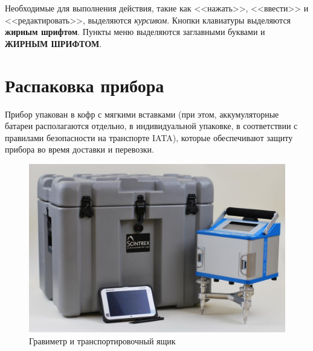 Необходимые для выполнения действия, такие как <<нажать>>, <<ввести>> и
<<редактировать>>, выделяются \textit{курсивом}. Кнопки клавиатуры выделяются
\textbf{жирным шрифтом}. Пункты меню выделяются заглавными буквами и
\textbf{ЖИРНЫМ ШРИФТОМ}.

\section{Распаковка прибора}

Прибор \cg{} упакован в кофр с мягкими вставками (при
этом, аккумуляторные батареи располагаются отдельно, в индивидуальной упаковке,
в соответствии с правилами безопасности на транспорте IATA), которые
обеспечивают защиту прибора во время доставки и перевозки.


\begin{figure}%
  \centering
  \includegraphics[width=\textwidth]{figures/the_cg6_autograv_gravity_meter_and_its_transportation_case}
  \caption{Гравиметр \cg{} и транспортировочный ящик}
  \label{fig:the_cg6_autograv_gravity_meter_and_its_transportation_case}
\end{figure}


